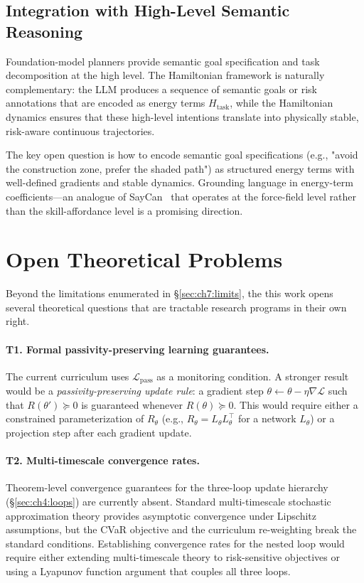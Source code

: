 \subsection{Integration with High-Level Semantic Reasoning}
\label{subsec:ch7:llm}

Foundation-model planners
provide semantic goal specification and task decomposition at the
high level.
The Hamiltonian framework is naturally complementary: the LLM
produces a sequence of semantic goals or risk annotations that
are encoded as energy terms $H_{\mathrm{task}}$, while the
Hamiltonian dynamics ensures that these high-level intentions
translate into physically stable, risk-aware continuous trajectories.

The key open question is how to encode semantic goal specifications
(e.g., "avoid the construction zone, prefer the shaded path")
as structured energy terms with well-defined gradients and stable
dynamics.
Grounding language in energy-term coefficients—an analogue of
SayCan~\citep{ahn2022saycan} that operates at the force-field
level rather than the skill-affordance level is a promising
direction.

\section{Open Theoretical Problems}
\label{sec:ch7:theory}

Beyond the limitations enumerated in §\ref{sec:ch7:limits}, the
this work opens several theoretical questions that are tractable
research programs in their own right.

\paragraph{T1. Formal passivity-preserving learning guarantees.}
The current curriculum uses $\mathcal{L}_{\mathrm{pass}}$ as a
monitoring condition.
A stronger result would be a \emph{passivity-preserving update rule}:
a gradient step $\theta \leftarrow \theta - \eta\nabla\mathcal{L}$
such that $R(\theta') \succeq 0$ is guaranteed whenever
$R(\theta) \succeq 0$.
This would require either a constrained parameterization of $R_\theta$
(e.g., $R_\theta = L_\theta L_\theta^\top$ for a network $L_\theta$)
or a projection step after each gradient update.

\paragraph{T2. Multi-timescale convergence rates.}
Theorem-level convergence guarantees for the three-loop update
hierarchy (§\ref{sec:ch4:loops}) are currently absent.
Standard multi-timescale stochastic approximation theory provides asymptotic
convergence under Lipschitz assumptions, but the CVaR objective
and the curriculum re-weighting break the standard conditions.
Establishing convergence rates for the nested loop would require
either extending multi-timescale theory to risk-sensitive objectives
or using a Lyapunov function argument that couples all three loops.

